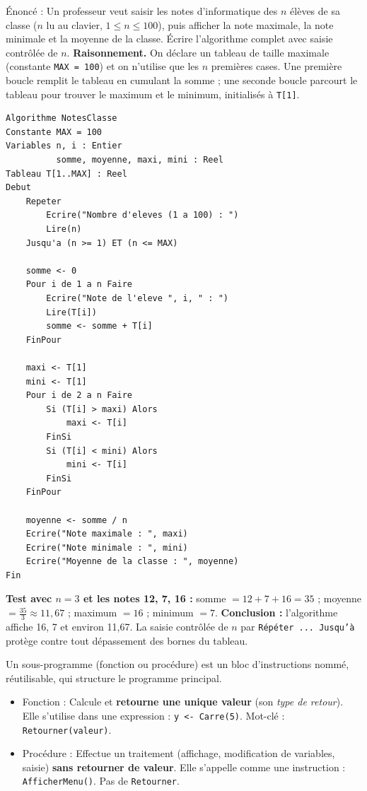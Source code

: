 \documentclass[11pt]{article}
\newcommand{\cle}[1]{{\popxbold\color{popdark}#1}}
\newcounter{popsec}
\newcounter{popsub}
\newcommand{\courssub}[1]{%
  \stepcounter{popsub}%
  \par\vspace{9pt}\noindent{\popxbold\fontsize{11.5}{13}\selectfont\color{popink}{\color{poporange}\thepopsec.\thepopsub}\hspace{6pt}#1}\par\nopagebreak\vspace{4pt}
}
\begin{document}
\begin{exoresolu}
Énoncé : Un professeur veut saisir les notes d'informatique des $n$ élèves de sa classe ($n$ lu au clavier, $1 \le n \le 100$), puis afficher la note maximale, la note minimale et la moyenne de la classe. Écrire l'algorithme complet avec saisie contrôlée de $n$.
\tcblower
\textbf{Raisonnement.} On déclare un tableau de taille maximale (constante \texttt{MAX = 100}) et on n'utilise que les $n$ premières cases. Une première boucle remplit le tableau en cumulant la somme ; une seconde boucle parcourt le tableau pour trouver le maximum et le minimum, initialisés à \texttt{T[1]}.

\begin{lstlisting}
Algorithme NotesClasse
Constante MAX = 100
Variables n, i : Entier
          somme, moyenne, maxi, mini : Reel
Tableau T[1..MAX] : Reel
Debut
    Repeter
        Ecrire("Nombre d'eleves (1 a 100) : ")
        Lire(n)
    Jusqu'a (n >= 1) ET (n <= MAX)

    somme <- 0
    Pour i de 1 a n Faire
        Ecrire("Note de l'eleve ", i, " : ")
        Lire(T[i])
        somme <- somme + T[i]
    FinPour

    maxi <- T[1]
    mini <- T[1]
    Pour i de 2 a n Faire
        Si (T[i] > maxi) Alors
            maxi <- T[i]
        FinSi
        Si (T[i] < mini) Alors
            mini <- T[i]
        FinSi
    FinPour

    moyenne <- somme / n
    Ecrire("Note maximale : ", maxi)
    Ecrire("Note minimale : ", mini)
    Ecrire("Moyenne de la classe : ", moyenne)
Fin
\end{lstlisting}

\textbf{Test avec $n = 3$ et les notes 12, 7, 16 :} somme $= 12 + 7 + 16 = 35$ ; moyenne $= \frac{35}{3} \approx 11,67$ ; maximum $= 16$ ; minimum $= 7$. \textbf{Conclusion :} l'algorithme affiche 16, 7 et environ 11,67. La saisie contrôlée de $n$ par \texttt{Répéter ... Jusqu'à} protège contre tout dépassement des bornes du tableau.
\end{exoresolu}

\courssub{Fonctions et procédures}

\begin{definition}
Un \cle{sous-programme} (fonction ou procédure) est un bloc d'instructions nommé, réutilisable, qui structure le programme principal.
\begin{itemize}
\item \cle{Fonction} : Calcule et \textbf{retourne une unique valeur} (son \emph{type de retour}). Elle s'utilise dans une expression : \texttt{y <- Carre(5)}. Mot-clé : \texttt{Retourner(valeur)}.
\item \cle{Procédure} : Effectue un traitement (affichage, modification de variables, saisie) \textbf{sans retourner de valeur}. Elle s'appelle comme une instruction : \texttt{AfficherMenu()}. Pas de \texttt{Retourner}.
\end{itemize}
\end{definition}
\end{document}
